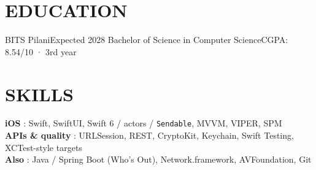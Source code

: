 \section{EDUCATION}
  \resumeSubHeadingListStart
    \resumeSubheading
      {BITS Pilani}{Expected 2028}
      {Bachelor of Science in Computer Science}{CGPA: 8.54/10 · 3rd year}
  \resumeSubHeadingListEnd

\section{SKILLS}
 \begin{itemize}[leftmargin=0in, label={}]
    \small{\item{
     \textbf{iOS} {: Swift, SwiftUI, Swift 6 / actors / \texttt{Sendable}, MVVM, VIPER, SPM} \vspace{1pt} \\
     \textbf{APIs \& quality} {: URLSession, REST, CryptoKit, Keychain, Swift Testing, XCTest-style targets} \vspace{1pt} \\
     \textbf{Also} {: Java / Spring Boot (Who's Out), Network.framework, AVFoundation, Git}
    }}
 \end{itemize}


